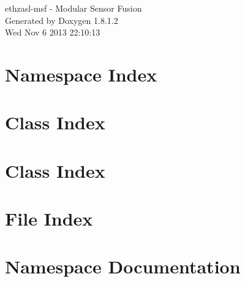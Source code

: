 \documentclass{book}
\begin{document}
\hypersetup{pageanchor=false,citecolor=blue}
\begin{titlepage}
\vspace*{7cm}
\begin{center}
{\Large ethzasl-\/msf -\/ Modular Sensor Fusion }\\
\vspace*{1cm}
{\large Generated by Doxygen 1.8.1.2}\\
\vspace*{0.5cm}
{\small Wed Nov 6 2013 22:10:13}\\
\end{center}
\end{titlepage}
\clearemptydoublepage
{}
\tableofcontents
\clearemptydoublepage
{}
\hypersetup{pageanchor=true,citecolor=blue}
\chapter{Namespace Index}

\chapter{Class Index}

\chapter{Class Index}

\chapter{File Index}

\chapter{Namespace Documentation}











\end{document}
